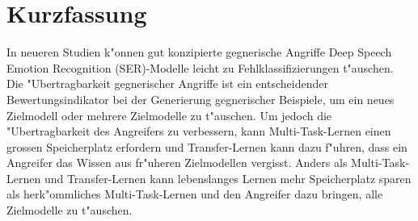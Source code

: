 %
% 


\chapter*{Kurzfassung}


\label{chap:Kurzfassung}

In neueren Studien k"onnen gut konzipierte gegnerische Angriffe Deep Speech Emotion Recognition (SER)-Modelle leicht zu Fehlklassifizierungen t"auschen. Die "Ubertragbarkeit gegnerischer Angriffe ist ein entscheidender Bewertungsindikator bei der Generierung gegnerischer Beispiele, um ein neues Zielmodell oder mehrere Zielmodelle zu t"auschen. Um jedoch die "Ubertragbarkeit des Angreifers zu verbessern, kann Multi-Task-Lernen einen grossen Speicherplatz erfordern und Transfer-Lernen kann dazu f"uhren, dass ein Angreifer das Wissen aus fr"uheren Zielmodellen vergisst. Anders als Multi-Task-Lernen und Transfer-Lernen kann lebenslanges Lernen mehr Speicherplatz sparen als herk"ommliches Multi-Task-Lernen und den Angreifer dazu bringen, alle Zielmodelle zu t"auschen.


